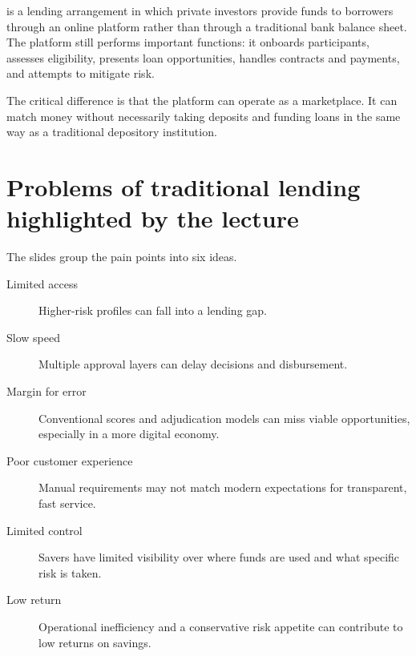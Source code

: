  is a lending arrangement in which private investors provide funds to borrowers through an online platform rather than through a traditional bank balance sheet. The platform still performs important functions: it onboards participants, assesses eligibility, presents loan opportunities, handles contracts and payments, and attempts to mitigate risk.

\begin{mlfigure}
\end{mlfigure}

The critical difference is that the platform can operate as a marketplace. It can match money without necessarily taking deposits and funding loans in the same way as a traditional depository institution.

\section{Problems of traditional lending highlighted by the lecture}

The slides group the pain points into six ideas.

\begin{description}
  \item[Limited access] Higher-risk profiles can fall into a lending gap.
  \item[Slow speed] Multiple approval layers can delay decisions and disbursement.
  \item[Margin for error] Conventional scores and adjudication models can miss viable opportunities, especially in a more digital economy.
  \item[Poor customer experience] Manual requirements may not match modern expectations for transparent, fast service.
  \item[Limited control] Savers have limited visibility over where funds are used and what specific risk is taken.
  \item[Low return] Operational inefficiency and a conservative risk appetite can contribute to low returns on savings.
\end{description}

